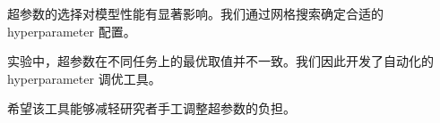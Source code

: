 超参数的选择对模型性能有显著影响。我们通过网格搜索确定合适的 hyperparameter 配置。

实验中，超参数在不同任务上的最优取值并不一致。我们因此开发了自动化的 hyperparameter 调优工具。

希望该工具能够减轻研究者手工调整超参数的负担。
